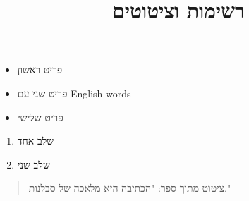 \documentclass[11pt,a4paper]{article}
\title{רשימות וציטוטים}
\date{}
\begin{document}
\maketitle

\begin{itemize}
\item פריט ראשון
\item פריט שני עם \foreignlanguage{english}{English words}
\item פריט שלישי
\end{itemize}

\begin{enumerate}
\item שלב אחד
\item שלב שני
\end{enumerate}

\begin{quote}
ציטוט מתוך ספר: "הכתיבה היא מלאכה של סבלנות."
\end{quote}
\end{document}
